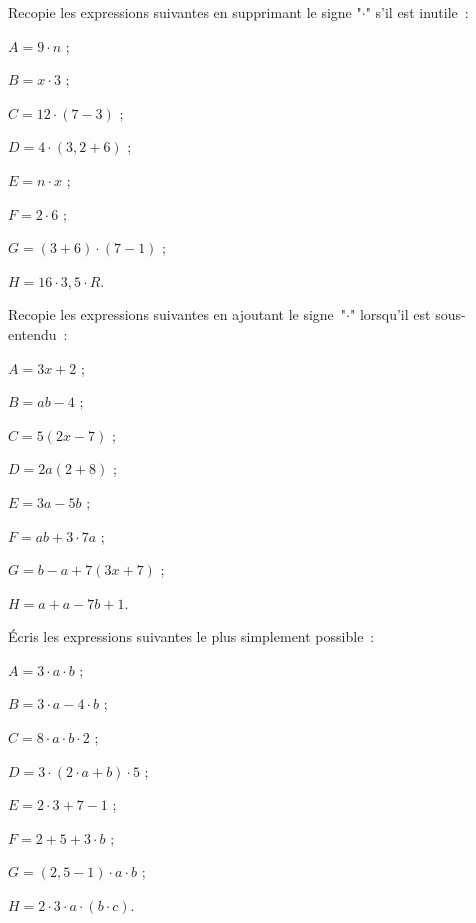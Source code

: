 

\begin{exercice}
Recopie les expressions suivantes en supprimant le signe "$\cdot$" s'il est inutile :
\begin{colitemize}{2}
 \item $A = 9 \cdot n$ ;
 \item $B = x \cdot 3$ ;
 \item $C = 12 \cdot (7 - 3)$ ;
 \item $D = 4 \cdot (3,2 + 6)$ ;
 \item $E = n \cdot x$ ;
 \item $F = 2 \cdot 6$ ;
 \item $G = (3 + 6) \cdot (7 - 1)$ ;
 \item $H = 16 \cdot 3,5 \cdot R$.
 \end{colitemize}
\end{exercice}


\begin{exercice}
Recopie les expressions suivantes en ajoutant le signe "$\cdot$" lorsqu'il est sous-entendu :
\begin{colitemize}{2}
 \item $A = 3x + 2$ ;
 \item $B = ab - 4$ ;
 \item $C = 5(2x - 7)$ ;
 \item $D = 2a(2 + 8)$ ;
 \item $E = 3a - 5b$ ;
 \item $F = ab + 3 \cdot 7a$ ;
 \item $G = b - a + 7(3x + 7)$ ;
 \item $H = a + a - 7b + 1$.
 \end{colitemize}
\end{exercice}


\begin{exercice}
Écris les expressions suivantes le plus simplement possible :
\begin{colitemize}{2}
 \item $A = 3 \cdot a \cdot b$ ; 
 \item $B = 3 \cdot a - 4 \cdot b$ ; 
 \item $C = 8 \cdot a \cdot b \cdot 2$ ;
 \item $D = 3 \cdot (2 \cdot a + b) \cdot 5$ ;
 \item $E = 2 \cdot 3 + 7 - 1$ ;
 \item $F = 2 + 5 + 3 \cdot b$ ; 
 \item $G = (2,5 - 1) \cdot a \cdot b$ ; 
 \item $H = 2 \cdot 3 \cdot a \cdot (b \cdot c)$.
 \end{colitemize}
\end{exercice}


